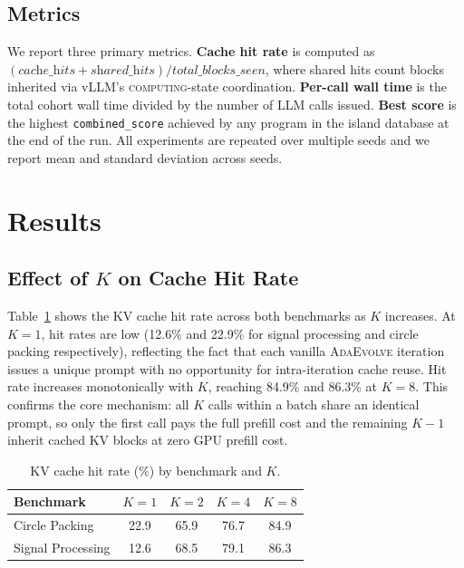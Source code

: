 \documentclass{article}
\newcommand{\adaev}{\textsc{AdaEvolve}}
\begin{document}
\subsection{Metrics}

We report three primary metrics. \textbf{Cache hit rate} is computed as
$(\textit{cache\_hits} + \textit{shared\_hits}) /
\textit{total\_blocks\_seen}$, where shared hits count blocks inherited
via vLLM's \textsc{computing}-state coordination. \textbf{Per-call wall
time} is the total cohort wall time divided by the number of LLM calls
issued. \textbf{Best score} is the highest \texttt{combined\_score}
achieved by any program in the island database at the end of the run.
All experiments are repeated over multiple seeds and we report mean and
standard deviation across seeds.

\section{Results}
\subsection{Effect of $K$ on Cache Hit Rate}

Table~\ref{tab:hit_rate} shows the KV cache hit rate across both
benchmarks as $K$ increases. At $K{=}1$, hit rates are low (12.6\% and
22.9\% for signal processing and circle packing respectively), reflecting
the fact that each vanilla \adaev{} iteration issues a unique prompt with
no opportunity for intra-iteration cache reuse. Hit rate increases
monotonically with $K$, reaching 84.9\% and 86.3\% at $K{=}8$. This
confirms the core mechanism: all $K$ calls within a batch share an
identical prompt, so only the first call pays the full prefill cost and
the remaining $K-1$ inherit cached KV blocks at zero GPU prefill cost.

\begin{table}[ht]
\centering
\small
\caption{KV cache hit rate (\%) by benchmark and $K$.}
\label{tab:hit_rate}
\begin{tabular}{lcccc}
\toprule
Benchmark & $K{=}1$ & $K{=}2$ & $K{=}4$ & $K{=}8$ \\
\midrule
Circle Packing    & 22.9 & 65.9 & 76.7 & 84.9 \\
Signal Processing & 12.6 & 68.5 & 79.1 & 86.3 \\
\bottomrule
\end{tabular}
\end{table}
\end{document}

